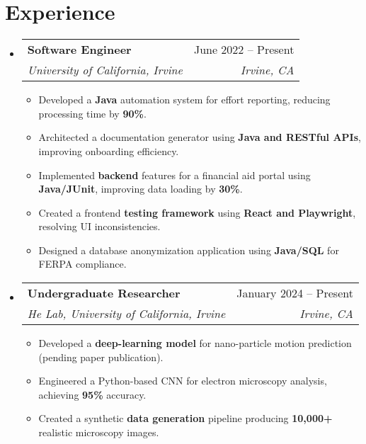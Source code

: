 \documentclass[letterpaper,11pt]{article}
\makeatletter
\newcommand{\resumeItem}[1]{
  \item\small{
    {#1 \vspace{-1pt}}
  }
}
\newcommand{\resumeSubheading}[4]{
  \vspace{-2pt}\item
    \begin{tabular*}{0.97\textwidth}[t]{l@{\extracolsep{\fill}}r}
      \textbf{#1} & #2 \\
      \textit{\small#3} & \textit{\small #4} \\
    \end{tabular*}\vspace{-5pt}
}
\newcommand{\resumeSubHeadingListStart}{\begin{itemize}[leftmargin=0.15in, label={}]}
\newcommand{\resumeSubHeadingListEnd}{\end{itemize}}
\newcommand{\resumeItemListStart}{\begin{itemize}}
\newcommand{\resumeItemListEnd}{\end{itemize}\vspace{-5pt}}
\makeatother
\begin{document}
\section{Experience}
  \resumeSubHeadingListStart
    \resumeSubheading
      {Software Engineer}{June 2022 -- Present}
      {University of California, Irvine}{Irvine, CA}
      \resumeItemListStart
        \resumeItem{Developed a \textbf{Java} automation system for effort reporting, reducing processing time by \textbf{90\%}.}
        \resumeItem{Architected a documentation generator using \textbf{Java and RESTful APIs}, improving onboarding efficiency.}
        \resumeItem{Implemented \textbf{backend} features for a financial aid portal using \textbf{Java/JUnit}, improving data loading by \textbf{30\%}.}
        \resumeItem{Created a frontend \textbf{testing framework} using \textbf{React and Playwright}, resolving UI inconsistencies.}
        \resumeItem{Designed a database anonymization application using \textbf{Java/SQL} for FERPA compliance.}
      \resumeItemListEnd
    \resumeSubheading
      {Undergraduate Researcher}{January 2024 -- Present}
      {He Lab, University of California, Irvine}{Irvine, CA}
      \resumeItemListStart
        \resumeItem{Developed a \textbf{deep-learning model} for nano-particle motion prediction (pending paper publication).}
        \resumeItem{Engineered a Python-based CNN for electron microscopy analysis, achieving \textbf{95\%} accuracy.}
        \resumeItem{Created a synthetic \textbf{data generation} pipeline producing \textbf{10,000+} realistic microscopy images.}
      \resumeItemListEnd
  \resumeSubHeadingListEnd

\end{document}
